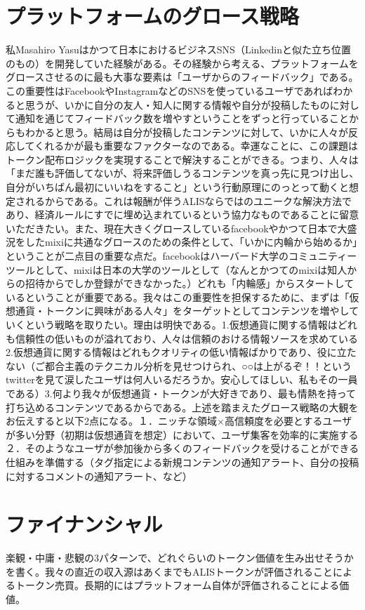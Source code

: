 \documentclass{jsarticle}
\begin{document}
\section{プラットフォームのグロース戦略}
私Masahiro Yasuはかつて日本におけるビジネスSNS（Linkedinと似た立ち位置のもの）を開発していた経験がある。その経験から考える、プラットフォームをグロースさせるのに最も大事な要素は「ユーザからのフィードバック」である。この重要性はFacebookやInstagramなどのSNSを使っているユーザであればわかると思うが、いかに自分の友人・知人に関する情報や自分が投稿したものに対して通知を通じてフィードバック数を増やすということをずっと行っていることからもわかると思う。結局は自分が投稿したコンテンツに対して、いかに人々が反応してくれるかが最も重要なファクターなのである。幸運なことに、この課題はトークン配布ロジックを実現することで解決することができる。つまり、人々は「まだ誰も評価してないが、将来評価しうるコンテンツを真っ先に見つけ出し、自分がいちばん最初にいいねをすること」という行動原理にのっとって動くと想定されるからである。これは報酬が伴うALISならではのユニークな解決方法であり、経済ルールにすでに埋め込まれているという協力なものであることに留意いただきたい。また、現在大きくグロースしているfacebookやかつて日本で大盛況をしたmixiに共通なグロースのための条件として、「いかに内輪から始めるか」ということが二点目の重要な点だ。facebookはハーバード大学のコミュニティーツールとして、mixiは日本の大学のツールとして（なんとかつてのmixiは知人からの招待からでしか登録ができなかった。）どれも「内輪感」からスタートしているということが重要である。我々はこの重要性を担保するために、まずは「仮想通貨・トークンに興味がある人々」をターゲットとしてコンテンツを増やしていくという戦略を取りたい。理由は明快である。1.仮想通貨に関する情報はどれも信頼性の低いものが溢れており、人々は信頼のおける情報ソースを求めている2.仮想通貨に関する情報はどれもクオリティの低い情報ばかりであり、役に立たない（ご都合主義のテクニカル分析を見せつけられ、○○は上がるぞ！！というtwitterを見て涙したユーザは何人いるだろうか。安心してほしい、私もその一員である）3.何より我々が仮想通貨・トークンが大好きであり、最も情熱を持って打ち込めるコンテンツであるからである。上述を踏まえたグロース戦略の大観をお伝えすると以下2点になる。１．ニッチな領域×高信頼度を必要とするユーザが多い分野（初期は仮想通貨を想定）において、ユーザ集客を効率的に実施する ２．そのようなユーザが参加後から多くのフィードバックを受けることができる仕組みを準備する（タグ指定による新規コンテンツの通知アラート、自分の投稿に対するコメントの通知アラート、など）
\section{ファイナンシャル}
楽観・中庸・悲観の3パターンで、どれぐらいのトークン価値を生み出せそうかを書く。我々の直近の収入源はあくまでもALISトークンが評価されることによるトークン売買。長期的にはプラットフォーム自体が評価されることによる価値。
\end{document}
